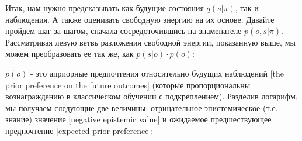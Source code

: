\documentclass[twoside,leqno, 11pt]{article}
\begin{document}
	Итак, нам нужно предсказывать как будущие состояния $q(s|\pi)$, так и наблюдения. А также оценивать свободную энергию на их основе. Давайте пройдем шаг за шагом, сначала сосредоточившись на знаменателе $p(o,s|\pi)$. Рассматривая левую ветвь разложения свободной энергии, показанную выше, мы можем преобразовать ее так же, как $p(s|o) \cdot p(o)$:
	
	
	\begin{figure}[h]
	\end{figure}
	
	$p(o)$ - это априорные предпочтения относительно будущих наблюдений [the prior preference on the future outcomes] (которые пропорциональны вознаграждению в классическом обучении с подкреплением). Разделив логарифм, мы получаем следующие две величины:  отрицательное эпистемическое (т.е. знание) значение [negative epistemic value] и ожидаемое предшествующее предпочтение [expected prior preference]:
	
	
	\begin{figure}[h]
	\end{figure}
	
\end{document}
